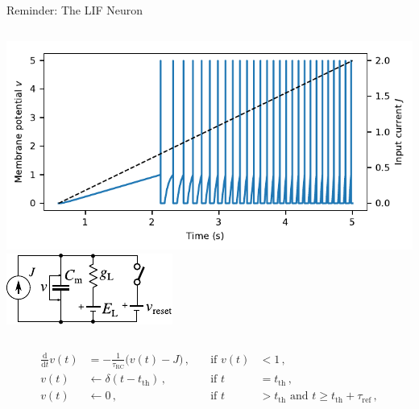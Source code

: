 \documentclass[handout,aspectratio=169]{beamer}
\begin{document}
\begin{frame}{Reminder: The LIF Neuron}
	\begin{columns}[c]
		\includegraphics[width=\textwidth]{media/lif_neuron_ramp.pdf}
		\includegraphics[width=\textwidth]{media/lif_circuit.pdf}
	\end{columns}
	\begin{align*}
		\frac{\mathrm{d}}{\mathrm{d}t} v(t) &= -\frac{1}{\tau_\mathrm{RC}} \big( v(t) - J \big) \,, \quad &\text{if } v(t) &< 1\,, \\
		v(t) &\gets \delta(t - t_\mathrm{th}) \,, &\text{if } t &= t_\mathrm{th} \,,\\
		v(t) &\gets 0 \,, &\text{if } t &> t_\mathrm{th} \text{ and } t \geq t_\mathrm{th} + \tau_\mathrm{ref} \,,
	\end{align*}
\end{frame}
\end{document}
